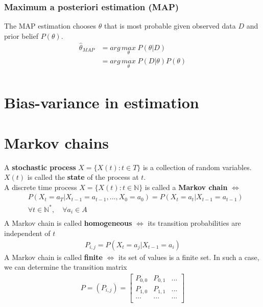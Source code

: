 \documentclass[../main.tex]{subfiles}
\begin{document}
\subsubsection{Maximum a posteriori estimation (MAP)}
The MAP estimation chooses $\theta$ that is most probable given observed data $D$ and prior belief
$P(\theta)$. \\

\begin{align*}
    \hat{\theta}_{MAP} & = arg\,\underset{\theta}{max}\; P(\theta | D) \\
                       & = arg\,\underset{\theta}{max}\; P(D | \theta) P(\theta) \\
\end{align*}

\section{Bias-variance in estimation}

\section{Markov chains}

A \textbf{stochastic process} $X = \{X(t): t \in T\}$ is a collection of random variables. $X(t)$ is
called the \textbf{state} of the process at $t$. \\

A discrete time process $X = \{X(t): t \in \mathbb{N}\}$ is called a \textbf{Markov chain}
$\Leftrightarrow$
\begin{align*}
    & P(X_t=a_T | X_{t-1} = a_{t-1}, ..., X_0 = a_0) = P(X_t = a_t | X_{t-1} = a_{t-1}) \\
    & \forall t \in \mathbb{N}^*, \quad \forall a_i \in A \\
\end{align*}
A Markov chain is called \textbf{homogeneous} $\Leftrightarrow$ its transition probabilities are
independent of $t$
\begin{align*}
    P_{i,j} = P(X_t = a_j | X_{t-1} = a_i)
\end{align*}
A Markov chain is called \textbf{finite} $\Leftrightarrow$ its set of values is a finite set.
In such a case, we can determine the transition matrix
\begin{align*}
    P = (P_{i, j}) =
    \begin{bmatrix}
        P_{0,0}  & P_{0,1} & ...\\
        P_{1, 0} & P_{1,1} & ...\\
        ...      & ...     & ...\\
    \end{bmatrix}
\end{align*}
\end{document}
